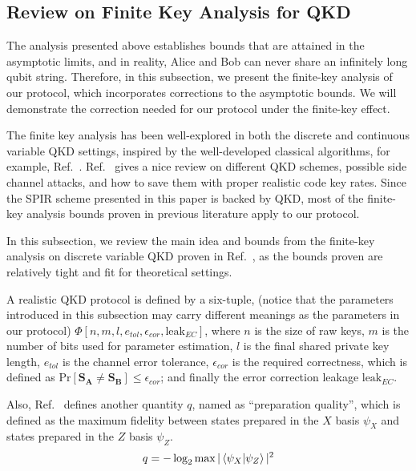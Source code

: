 \documentclass[%
 reprint,
superscriptaddress,
 amsmath,amssymb,
 aps,
]{revtex4-2}
\begin{document}
\subsection{Review on Finite Key Analysis for QKD}
\label{sec:Finite_key_analysis_qkd}
The analysis presented above establishes bounds that are attained in the asymptotic limits, and in reality, Alice and Bob can never share an infinitely long qubit string. Therefore, in this subsection, we present the finite-key analysis of our protocol, which incorporates corrections to the asymptotic bounds. We will demonstrate the correction needed for our protocol under the finite-key effect.

The finite key analysis has been well-explored in both the discrete and continuous variable QKD settings, inspired by the well-developed classical algorithms, for example, Ref.~\cite{Finite_key_analysis1, Finite_key_analysis2, Finite_key_analysis3, Rates_for_realistic_code1, Rates_for_realistic_code2, Rates_for_realistic_code3}. Ref.~\cite{Rates_for_realistic_code2} gives a nice review on different QKD schemes, possible side channel attacks, and how to save them with proper realistic code key rates. Since the SPIR scheme presented in this paper is backed by QKD, most of the finite-key analysis bounds proven in previous literature apply to our protocol. 

In this subsection, we review the main idea and bounds from the finite-key analysis on discrete variable QKD proven in Ref.~\cite{Finite_key_analysis1}, as the bounds proven are relatively tight and fit for theoretical settings.

A realistic QKD protocol is defined by a six-tuple, (notice that the parameters introduced in this subsection may carry different meanings as the parameters in our protocol) $\Phi[n, m, l, e_{tol}, \epsilon_{cor}, \text{leak}_{EC}]$, where $n$ is the size of raw keys, $m$ is the number of bits used for parameter estimation, $l$ is the final shared private key length, $e_{tol}$ is the channel error tolerance, $\epsilon_{cor}$ is the required correctness, which is defined as $\text{Pr}[\mathbf{S_{A}}\ne \mathbf{S_{B}}]\le\epsilon_{cor}$; and finally the error correction leakage $\text{leak}_{EC}$.

Also, Ref.~\cite{Finite_key_analysis1} defines another quantity $q$, named as ``preparation quality'', which is defined as the maximum fidelity between states prepared in the $X$ basis $\psi_X$ and states prepared in the $Z$ basis $\psi_Z$.
\begin{equation}
    q=-\log_2\max|\bra{\psi_X}\ket{\psi_Z}|^2
\end{equation}
\end{document}
